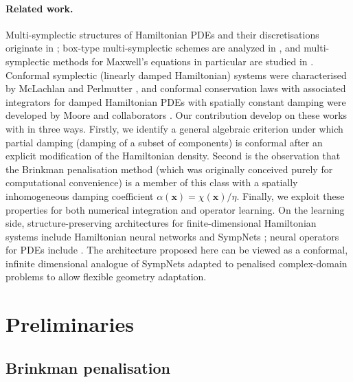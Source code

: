 \documentclass[11pt]{article}
\theoremstyle{definition}
\theoremstyle{remark}
\newcommand{\bx}{\bm{x}}
\newcommand{\chixx}{\chi(\bx)}
\begin{document}
\paragraph{Related work.}
Multi-symplectic structures of Hamiltonian PDEs and their
discretisations originate in
\cite{bridges1997multi,bridges2001multi,marsden1998multisymplectic};
box-type multi-symplectic schemes are analyzed in
\cite{bridges2001multi,moore2003backward}, and multi-symplectic
methods for Maxwell's equations in particular are studied in
\cite{sun2019maxwell}.  Conformal symplectic (linearly
damped Hamiltonian) systems were characterised by McLachlan and
Perlmutter \cite{mclachlan2001conformal}, and conformal conservation
laws with associated integrators for damped Hamiltonian PDEs with spatially constant damping %
were developed by Moore and collaborators
\cite{moore2013conformal,bhatt2016conformal}.  Our contribution develop on these works with in three ways. Firstly, we identify a general algebraic criterion under which partial damping (damping of a subset of components) is conformal after an explicit
modification of the Hamiltonian density. Second is the observation that the Brinkman penalisation method (which was originally conceived purely for computational convenience) is a member of this class with a spatially inhomogeneous damping coefficient $\alpha(\bx)=\chixx/\eta$. Finally, we exploit these properties for both numerical integration and operator learning.  On the learning side, structure-preserving architectures for finite-dimensional Hamiltonian systems include
Hamiltonian neural networks \cite{greydanus2019hamiltonian} and
SympNets \cite{jin2020sympnets}; neural operators for PDEs include
\cite{lu2021learning,li2021fourier,kovachki2023neural}.  The
architecture proposed here can be viewed as a conformal, infinite
dimensional analogue of SympNets adapted to penalised complex-domain
problems to allow flexible geometry adaptation. 

\section{Preliminaries}
\label{sec:preliminaries}

\subsection{Brinkman penalisation}
\label{subsec:brinkman}
\end{document}
